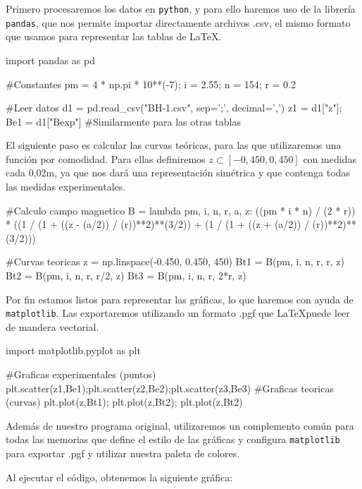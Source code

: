\documentclass[12pt, a4paper, titlepage]{article}
\newcommand{\code}[1]{\texttt{#1}} %
\begin{document}
  Primero procesaremos los datos en \code{python}, y para ello haremos uso de la librería \code{pandas}, que nos permite importar directamente archivos .csv, el mismo formato que usamos para representar las tablas de \LaTeX.

  \begin{python}
    import pandas as pd

    #Constantes
    pm = 4 * np.pi * 10**(-7); i = 2.55; n = 154; r = 0.2

    #Leer datos
    d1 = pd.read_csv("BH-1.csv", sep=';', decimal=',')
    z1 = d1["z"]; Be1 = d1["Bexp"] #Similarmente para las otras tablas
  \end{python}

  El siguiente paso es calcular las curvas teóricas, para las que utilizaremos una función por comodidad. Para ellas definiremos $z \subset [-0,450, 0,450]$ con medidas cada 0,02m, ya que nos dará una representación simétrica y que contenga todas las medidas experimentales.

  \begin{python}
    #Calculo campo magnetico
    B = lambda pm, i, n, r, a, z: ((pm * i * n) / (2 * r)) *
        ((1 / (1 + ((z - (a/2)) / (r))**2)**(3/2)) +
        (1 / (1 + ((z + (a/2)) / (r))**2)**(3/2)))

    #Curvas teoricas
    z = np.linspace(-0.450, 0.450, 450)
    Bt1 = B(pm, i, n, r, r, z)
    Bt2 = B(pm, i, n, r, r/2, z)
    Bt3 = B(pm, i, n, r, 2*r, z)
  \end{python}

  Por fin estamos listos para representar las gráficas, lo que haremos con ayuda de \code{matplotlib}. Las exportaremos utilizando un formato .pgf que \LaTeX puede leer de mandera vectorial.

  \begin{python}
    import matplotlib.pyplot as plt

    #Graficas experimentales (puntos)
    plt.scatter(z1,Be1);plt.scatter(z2,Be2);plt.scatter(z3,Be3)
    #Graficas teoricas (curvas)
    plt.plot(z,Bt1); plt.plot(z,Bt2); plt.plot(z,Bt2)
  \end{python}

  Además de nuestro programa original, utilizaremos un complemento común para todas las memorias que define el estilo de las gráficas y configura \code{matplotlib} para exportar .pgf y utilizar nuestra paleta de colores.

  Al ejecutar el código, obtenemos la siguiente gráfica:
\end{document}
